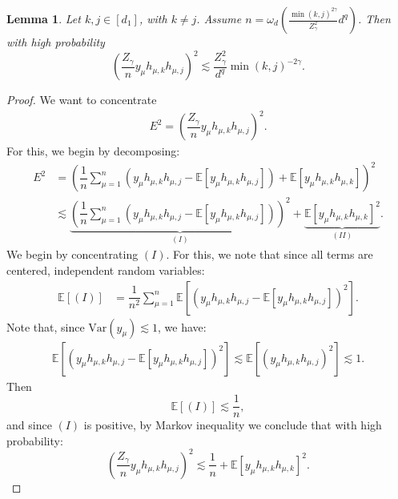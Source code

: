 \documentclass[10pt,a4paper]{amsart}
\newtheorem{lemma}{Lemma}
\newcommand{\EE}{\mathbb{E}}
\begin{document}
\begin{lemma}
    Let $k,j \in [d_1]$, with $k \not =j$. Assume $n = \omega_{d}(\frac{\min(k,j)^{2\gamma}}{Z_\gamma ^{2}}d^{q} )$. Then with high probability 
    $$
        \left ( \dfrac{Z_\gamma }{n} y_\mu h_{\mu,k} h_{\mu,j} \right )^{2} \lesssim \dfrac{Z_\gamma ^2}{d^{q}} \min(k,j)^{-2\gamma}. 
    $$
    \label{lemma:bound_square_y_s}
\end{lemma}

\begin{proof}
    We want to concentrate
    \begin{align}
         E^{2} =\left ( \dfrac{Z_\gamma }{n} y_\mu h_{\mu,k} h_{\mu,j} \right )^{2}. 
    \end{align}
     For this, we begin by decomposing: 
    \begin{align}
        E^{2} & = \left (  \dfrac{1}{n} \sum_{\mu=1}^{n} \left ( y_\mu h_{\mu,k} h_{\mu,j} -\EE\left [y_\mu h_{\mu,k} h_{\mu,j}\right ]\right ) + \EE \left [ y_\mu h_{\mu,k}h_{\mu,k} \right ] \right )^{2} \\ 
        & \lesssim \underbrace{\left ( \dfrac{1}{n} \sum_{\mu=1}^{n} \left ( y_\mu h_{\mu,k} h_{\mu,j} -\EE\left [y_\mu h_{\mu,k} h_{\mu,j}\right ]\right )\right )^{2}}_{(I)} + \underbrace{\EE \left [ y_\mu h_{\mu,k}h_{\mu,k} \right ] ^{2}}_{(II)}. 
    \end{align}
    We begin by concentrating $(I)$. For this, we note that since all terms are centered, independent random variables: 
    \begin{align}
        \EE \left [ (I) \right ] & = \dfrac{1}{n^{2}} \sum_{\mu =1 }^{n}  \EE \left [ \left ( y_\mu h_{\mu,k} h_{\mu,j} -\EE\left [y_\mu h_{\mu,k} h_{\mu,j}\right ]\right )^{2}\right ].
    \end{align}
    Note that, since $\mathrm{Var}(y_\mu) \lesssim 1$, we have: 
    \begin{align}
        \EE \left [ \left ( y_\mu h_{\mu,k} h_{\mu,j} -\EE\left [y_\mu h_{\mu,k} h_{\mu,j}\right ]\right )^{2}\right ] \lesssim \EE \left [ \left ( y_\mu h_{\mu,k} h_{\mu,j} \right )^{2} \right ] \lesssim 1. 
    \end{align}
    Then
    \begin{equation}
        \EE \left [ (I) \right ] \lesssim \dfrac{1}{n},
    \end{equation}
    and since $(I)$ is positive, by Markov inequality we conclude that with high probability: 
    \begin{equation}
        \left ( \dfrac{Z_\gamma }{n} y_\mu h_{\mu,k} h_{\mu,j} \right )^{2} \lesssim \dfrac{1}{n}  + \EE \left [ y_\mu h_{\mu,k}h_{\mu,k} \right ] ^{2}. 

\end{equation}
\end{proof}
\end{document}
